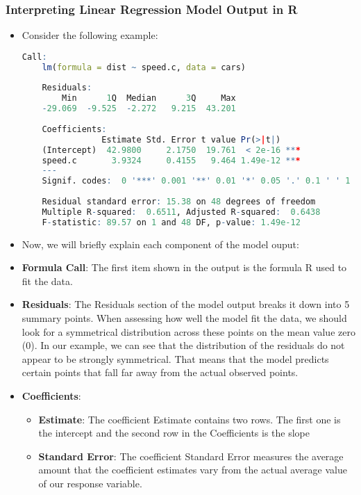\documentclass[a4paper]{article}
\begin{document}
\subsubsection{Interpreting Linear Regression Model Output in R}
\begin{itemize}
    \item[] Consider the following example:
    \begin{lstlisting}[language=R]
    Call:
    lm(formula = dist ~ speed.c, data = cars)
 
    Residuals:
        Min      1Q  Median      3Q     Max 
    -29.069  -9.525  -2.272   9.215  43.201 
 
    Coefficients:
                Estimate Std. Error t value Pr(>|t|)    
    (Intercept)  42.9800     2.1750  19.761  < 2e-16 ***
    speed.c       3.9324     0.4155   9.464 1.49e-12 ***
    ---
    Signif. codes:  0 '***' 0.001 '**' 0.01 '*' 0.05 '.' 0.1 ' ' 1
    
    Residual standard error: 15.38 on 48 degrees of freedom
    Multiple R-squared:  0.6511, Adjusted R-squared:  0.6438 
    F-statistic: 89.57 on 1 and 48 DF, p-value: 1.49e-12
    \end{lstlisting}
    
    \item[] Now, we will briefly explain each component of the model ouput:
    
    \item[] \textbf{Formula Call}: The first item shown in the output is the formula R used to fit the data.
    
    \item[] \textbf{Residuals}: The Residuals section of the model output breaks it down into 5 summary points. When assessing how well the model fit the data, we should look for a symmetrical distribution across these points on the mean value zero (0). In our example, we can see that the distribution of the residuals do not appear to be strongly symmetrical. That means that the model predicts certain points that fall far away from the actual observed points.
    
    \item[] \textbf{Coefficients}:
    \begin{itemize}
        \item[] \textbf{Estimate}: The coefficient Estimate contains two rows. The first one is the intercept and the second row in the Coefficients is the slope
        
        \item[] \textbf{Standard Error}: The coefficient Standard Error measures the average amount that the coefficient estimates vary from the actual average value of our response variable.
        

\end{itemize}
\end{itemize}
\end{document}
